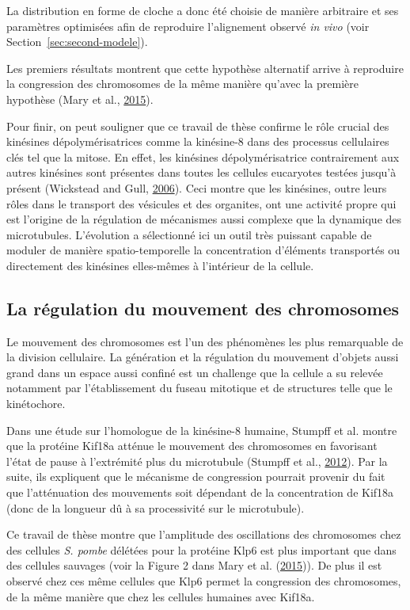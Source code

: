 \documentclass[12pt,a4paper,twoside,openright]{book}
\begin{document}
La distribution en forme de cloche a donc été choisie de manière
arbitraire et ses paramètres optimisées afin de reproduire l'alignement
observé \emph{in vivo} (voir Section~\ref{sec:second-modele}).

Les premiers résultats montrent que cette hypothèse alternatif arrive à
reproduire la congression des chromosomes de la même manière qu'avec la
première hypothèse (Mary et al., \hyperref[ref-Mary2015]{2015}).

Pour finir, on peut souligner que ce travail de thèse confirme le rôle
crucial des kinésines dépolymérisatrices comme la kinésine-8 dans des
processus cellulaires clés tel que la mitose. En effet, les kinésines
dépolymérisatrice contrairement aux autres kinésines sont présentes dans
toutes les cellules eucaryotes testées jusqu'à présent (Wickstead and
Gull, \hyperref[ref-Wickstead2006]{2006}). Ceci montre que les
kinésines, outre leurs rôles dans le transport des vésicules et des
organites, ont une activité propre qui est l'origine de la régulation de
mécanismes aussi complexe que la dynamique des microtubules. L'évolution
a sélectionné ici un outil très puissant capable de moduler de manière
spatio-temporelle la concentration d'éléments transportés ou directement
des kinésines elles-mêmes à l'intérieur de la cellule.

\subsection{La régulation du mouvement des
chromosomes}\label{la-ruxe9gulation-du-mouvement-des-chromosomes}

Le mouvement des chromosomes est l'un des phénomènes les plus
remarquable de la division cellulaire. La génération et la régulation du
mouvement d'objets aussi grand dans un espace aussi confiné est un
challenge que la cellule a su relevée notamment par l'établissement du
fuseau mitotique et de structures telle que le kinétochore.

Dans une étude sur l'homologue de la kinésine-8 humaine, Stumpff et al.
montre que la protéine Kif18a atténue le mouvement des chromosomes en
favorisant l'état de pause à l'extrémité plus du microtubule (Stumpff et
al., \hyperref[ref-Stumpff2012]{2012}). Par la suite, ils expliquent que
le mécanisme de congression pourrait provenir du fait que l'atténuation
des mouvements soit dépendant de la concentration de Kif18a (donc de la
longueur dû à sa processivité sur le microtubule).

Ce travail de thèse montre que l'amplitude des oscillations des
chromosomes chez des cellules \emph{S. pombe} délétées pour la protéine
Klp6 est plus important que dans des cellules sauvages (voir la Figure 2
dans Mary et al. (\hyperref[ref-Mary2015]{2015})). De plus il est
observé chez ces même cellules que Klp6 permet la congression des
chromosomes, de la même manière que chez les cellules humaines avec
Kif18a.
\end{document}

